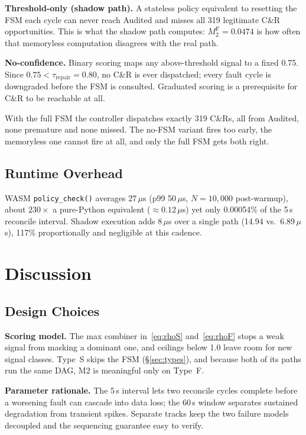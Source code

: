 \documentclass[conference]{IEEEtran}
\begin{document}
\textbf{Threshold-only (shadow path).} A stateless policy equivalent to resetting the FSM each cycle can never reach Audited and misses all 319 legitimate C\&R opportunities. This is what the shadow path computes: $M_2^\mathrm{F} = 0.0474$ is how often that memoryless computation disagrees with the real path.

\textbf{No-confidence.} Binary scoring maps any above-threshold signal to a fixed 0.75. Since $0.75 < \tau_{\mathrm{repair}} = 0.80$, no C\&R is ever dispatched; every fault cycle is downgraded before the FSM is consulted. Graduated scoring is a prerequisite for C\&R to be reachable at all.

With the full FSM the controller dispatches exactly 319 C\&Rs, all from Audited, none premature and none missed. The no-FSM variant fires too early, the memoryless one cannot fire at all, and only the full FSM gets both right.


\subsection{Runtime Overhead}
\label{sec:overhead}

WASM \texttt{policy\_check()} averages 27\,$\mu$s (p99 50\,$\mu$s, $N = 10{,}000$ post-warmup), about $230{\times}$ a pure-Python equivalent (${\approx}0.12\,\mu$s) yet only 0.00054\% of the 5\,s reconcile interval. Shadow execution adds 8\,$\mu$s over a single path (14.94 vs.\ 6.89\,$\mu$s), 117\% proportionally and negligible at this cadence.

\section{Discussion}
\label{sec:discussion}

\subsection{Design Choices}

\textbf{Scoring model.} The max combiner in~\eqref{eq:rhoS} and~\eqref{eq:rhoF} stops a weak signal from masking a dominant one, and ceilings below 1.0 leave room for new signal classes. Type~S skips the FSM (\S\ref{sec:types}), and because both of its paths run the same DAG, M2 is meaningful only on Type~F.

\textbf{Parameter rationale.} The 5\,s interval lets two reconcile cycles complete before a worsening fault can cascade into data loss; the 60\,s window separates sustained degradation from transient spikes. Separate tracks keep the two failure models decoupled and the sequencing guarantee easy to verify.
\end{document}
